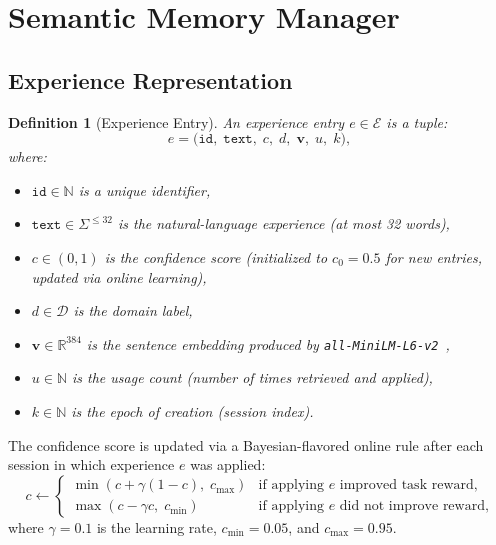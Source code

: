 \documentclass[11pt]{article}
\newtheorem{definition}{Definition}
\begin{document}
\section{Semantic Memory Manager}
\label{sec:memory}

\subsection{Experience Representation}

\begin{definition}[Experience Entry]
\label{def:experience}
An experience entry $e \in \mathcal{E}$ is a tuple:
\begin{equation}
    e = \bigl(\texttt{id},\; \texttt{text},\; c,\; d,\; \bm{v},\; u,\; k\bigr),
    \label{eq:experience}
\end{equation}
where:
\begin{itemize}[leftmargin=1.5em]
    \item $\texttt{id} \in \mathbb{N}$ is a unique identifier,
    \item $\texttt{text} \in \Sigma^{\leq 32}$ is the natural-language experience
          (at most 32 words),
    \item $c \in (0, 1)$ is the confidence score (initialized to $c_0 = 0.5$
          for new entries, updated via online learning),
    \item $d \in \mathcal{D}$ is the domain label,
    \item $\bm{v} \in \mathbb{R}^{384}$ is the sentence embedding produced by
          \texttt{all-MiniLM-L6-v2}~\cite{reimers2019sentence},
    \item $u \in \mathbb{N}$ is the usage count (number of times retrieved and
          applied),
    \item $k \in \mathbb{N}$ is the epoch of creation (session index).
\end{itemize}
\end{definition}

The confidence score is updated via a Bayesian-flavored online rule after each
session in which experience $e$ was applied:
\begin{equation}
    c \leftarrow
    \begin{cases}
        \min(c + \gamma(1 - c),\; c_{\max}) & \text{if applying } e \text{ improved task reward,} \\
        \max(c - \gamma c,\; c_{\min}) & \text{if applying } e \text{ did not improve reward,}
    \end{cases}
    \label{eq:confidence-update}
\end{equation}
where $\gamma = 0.1$ is the learning rate, $c_{\min} = 0.05$, and
$c_{\max} = 0.95$.
\end{document}
